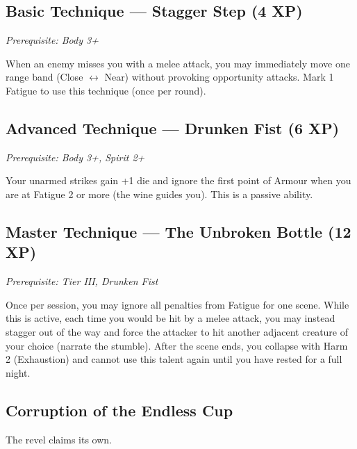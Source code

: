 \documentclass[11pt]{book}
\begin{document}
\subsection*{Basic Technique --- Stagger Step (4 XP)}
\textit{Prerequisite: Body 3+}

When an enemy misses you with a melee attack, you may immediately move one range band (Close $\leftrightarrow$ Near) without provoking opportunity attacks. Mark 1 Fatigue to use this technique (once per round).

\subsection*{Advanced Technique --- Drunken Fist (6 XP)}
\textit{Prerequisite: Body 3+, Spirit 2+}

Your unarmed strikes gain +1 die and ignore the first point of Armour when you are at Fatigue 2 or more (the wine guides you). This is a passive ability.

\subsection*{Master Technique --- The Unbroken Bottle (12 XP)}
\textit{Prerequisite: Tier III, Drunken Fist}

Once per session, you may ignore all penalties from Fatigue for one scene. While this is active, each time you would be hit by a melee attack, you may instead stagger out of the way and force the attacker to hit another adjacent creature of your choice (narrate the stumble). After the scene ends, you collapse with Harm 2 (Exhaustion) and cannot use this talent again until you have rested for a full night.

\subsection*{Corruption of the Endless Cup}

The revel claims its own.
\end{document}
